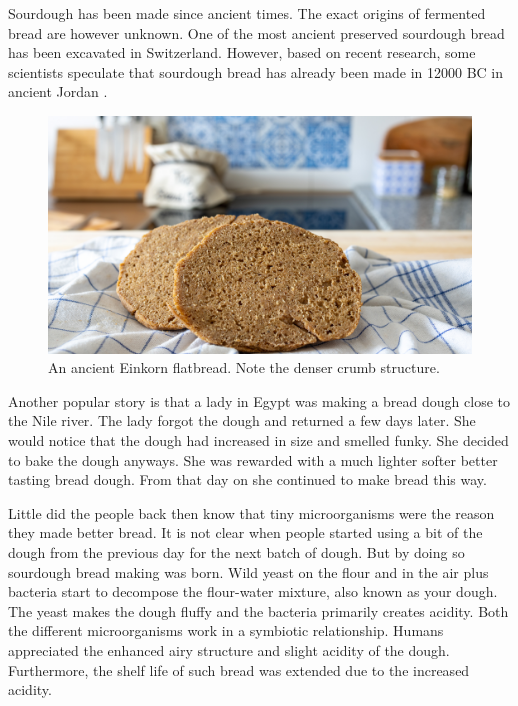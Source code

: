 Sourdough has been made since ancient times. The exact origins
of fermented bread are however unknown. One of the most ancient
preserved sourdough bread has been excavated in Switzerland.
However, based on recent research, some scientists speculate
that sourdough bread has already been made in 12000 BC in ancient
Jordan \cite{jordan+bread}.

\begin{figure}[h]
  \includegraphics[width=\textwidth]{einkorn-crumb}
  \caption{An ancient Einkorn flatbread. Note the denser crumb structure.}
  \label{einkorn-crumb}
\end{figure}

Another popular story is that a lady in Egypt was making
a bread dough close to the Nile river. The lady forgot the
dough and returned a few days later. She would notice that
the dough had increased in size and smelled funky. She decided
to bake the dough anyways. She was rewarded with a much
lighter softer better tasting bread dough. From that day
on she continued to make bread this way.

Little did the people back then know that tiny microorganisms
were the reason they made better bread. It is not clear when
people started using a bit of the dough from the previous
day for the next batch of dough. But by doing so sourdough
bread making was born. Wild yeast on the flour and in the air
plus bacteria start to decompose the flour-water mixture, also
known as your dough. The yeast makes the dough fluffy and
the bacteria primarily creates acidity. Both the different
microorganisms work in a symbiotic relationship. Humans
appreciated the enhanced airy structure and slight acidity
of the dough. Furthermore, the shelf life of such bread
was extended due to the increased acidity. 

